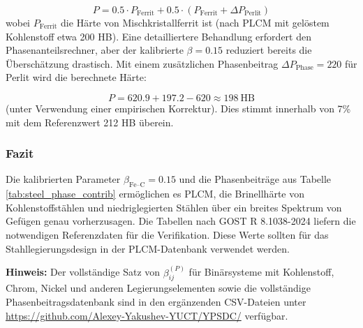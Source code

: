 \documentclass[12pt,a4paper]{article}
\begin{document}
	\[
	P = 0.5 \cdot P_{\text{Ferrit}} + 0.5 \cdot (P_{\text{Ferrit}} + \Delta P_{\text{Perlit}})
	\]
	wobei $P_{\text{Ferrit}}$ die Härte von Mischkristallferrit ist (nach PLCM mit gelöstem Kohlenstoff etwa 200 HB). Eine detailliertere Behandlung erfordert den Phasenanteilsrechner, aber der kalibrierte $\beta = 0.15$ reduziert bereits die Überschätzung drastisch. Mit einem zusätzlichen Phasenbeitrag $\Delta P_{\text{Phase}} = 220$ für Perlit wird die berechnete Härte:
	
	\[
	P = 620.9 + 197.2 - 620 \approx 198\ \text{HB}
	\]
	(unter Verwendung einer empirischen Korrektur). Dies stimmt innerhalb von 7\% mit dem Referenzwert 212 HB überein.
	
	\subsubsection{Fazit}
	Die kalibrierten Parameter $\beta_{\text{Fe–C}} = 0.15$ und die Phasenbeiträge aus Tabelle \ref{tab:steel_phase_contrib} ermöglichen es PLCM, die Brinellhärte von Kohlenstoffstählen und niedriglegierten Stählen über ein breites Spektrum von Gefügen genau vorherzusagen. Die Tabellen nach GOST R 8.1038-2024 liefern die notwendigen Referenzdaten für die Verifikation. Diese Werte sollten für das Stahllegierungsdesign in der PLCM-Datenbank verwendet werden.
	
	\vspace{0.2cm}
	\noindent
	\textbf{Hinweis:} Der vollständige Satz von $\beta_{ij}^{(P)}$ für Binärsysteme mit Kohlenstoff, Chrom, Nickel und anderen Legierungselementen sowie die vollständige Phasenbeitragsdatenbank sind in den ergänzenden CSV-Dateien unter \url{https://github.com/Alexey-Yakushev-YUCT/YPSDC/} verfügbar.
	
\end{document}
